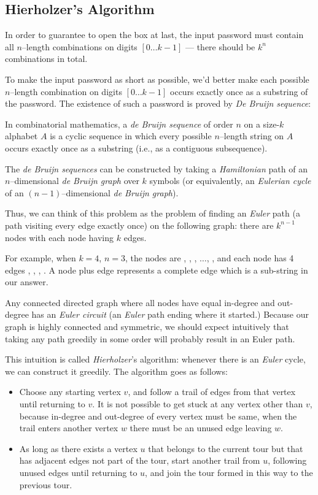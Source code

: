 \subsection{Hierholzer's Algorithm}

In order to guarantee to open the box at last, the input password must contain all $n$--length combinations on digits $[0\ldots k-1]$ --- there should be $k^n$ combinations in total.

To make the input password as short as possible, we'd better make each possible $n$--length combination on digits $[0\ldots k-1]$ occurs exactly once as a substring of the password. The existence of such a password is proved by \textit{De Bruijn sequence}:

In combinatorial mathematics, a \textit{de Bruijn sequence} of order $n$ on a size-$k$ alphabet $A$ is a cyclic sequence in which every possible $n$--length string on $A$ occurs exactly once as a substring (i.e., as a contiguous subsequence). 

The \textit{de Bruijn sequences} can be constructed by taking a \textit{Hamiltonian} path of an $n$--dimensional \textit{de Bruijn graph} over $k$ symbols (or equivalently, an \textit{Eulerian cycle} of an $(n − 1)$--dimensional \textit{de Bruijn graph}).

Thus, we can think of this problem as the problem of finding an \textit{Euler} path (a path visiting every edge exactly once) on the following graph: there are $k^{n-1}$ nodes with each node having $k$ edges.

For example, when $k = 4$, $n = 3$, the nodes are , , , $\ldots$, ,  and each node has 4 edges , , , . A node plus edge represents a complete edge which is a sub-string in our answer.

Any connected directed graph where all nodes have equal in-degree and out-degree has an \textit{Euler circuit} (an \textit{Euler} path ending where it started.) Because our graph is highly connected and symmetric, we should expect intuitively that taking any path greedily in some order will probably result in an Euler path.

This intuition is called \textit{Hierholzer}'s algorithm: whenever there is an \textit{Euler} cycle, we can construct it greedily. The algorithm goes as follows:

\begin{itemize}
\item Choose any starting vertex $v$, and follow a trail of edges from that vertex until returning to $v$. It is not possible to get stuck at any vertex other than $v$, because in-degree and out-degree of every vertex must be same, when the trail enters another vertex $w$ there must be an unused edge leaving $w$.

\item As long as there exists a vertex $u$ that belongs to the current tour but that has adjacent edges not part of the tour, start another trail from $u$, following unused edges until returning to $u$, and join the tour formed in this way to the previous tour.
\end{itemize}

